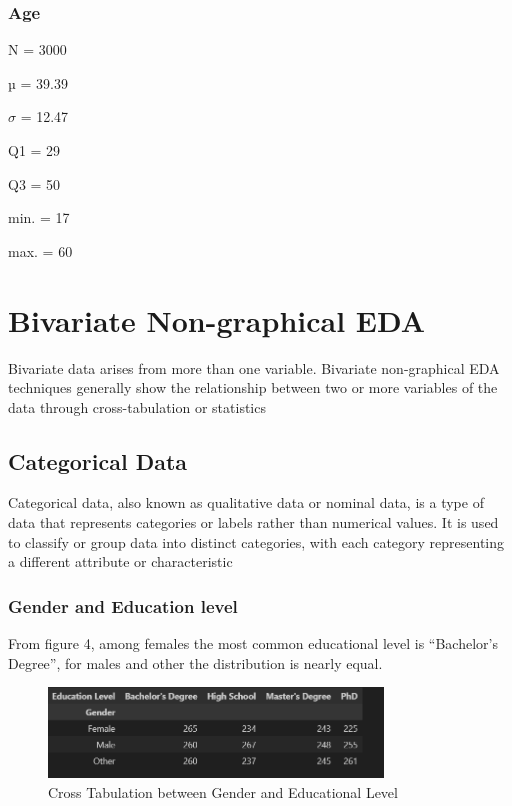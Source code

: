 \documentclass[lettersize,journal]{IEEEtran}
\begin{document}
\subsubsection{Age}
\begin{list}{}{}
\item[N = 3000]
\item[µ = 39.39]
\item[$\sigma$ = 12.47]
\item[Q1 = 29]
\item[Q3 = 50]
\item[min. = 17]
\item[max. = 60]
\end{list}


\section{Bivariate Non-graphical EDA}
Bivariate data arises from more than one variable. Bivariate non-graphical EDA techniques generally show the relationship between two or more variables of the data through cross-tabulation or statistics
\subsection{Categorical Data}
Categorical data, also known as qualitative data or nominal data, is a type of data that represents categories or labels rather than numerical values. It is used to classify or group data into distinct categories, with each category representing a different attribute or characteristic

\subsubsection{Gender and Education level}

From figure 4, among females the most common
educational level is “Bachelor’s Degree”, for males and other
the distribution is nearly equal.
\begin{figure}[h]
\centering
\includegraphics[width=3.5in]{Screenshot 2023-09-08 155959.png}
\caption{Cross Tabulation between Gender and Educational Level}
\label{fig_4}
\end{figure}
\end{document}
